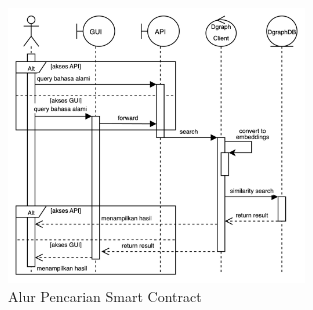 \begin{figure}[ht]
	\centering
	\includegraphics[width=0.7\textwidth]{resources/chapter-3/sequence-1.png}
	\caption{Alur Pencarian Smart Contract}
	\label{image:alur-pencarian-smart-contract}
\end{figure}








